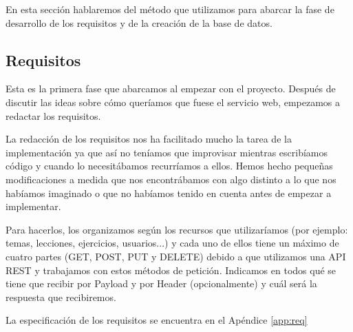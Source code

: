 En esta sección hablaremos del método que utilizamos para abarcar la fase de desarrollo de los requisitos y de la creación de la base de datos.

\subsection{Requisitos}
Esta es la primera fase que abarcamos al empezar con el proyecto. Después de discutir las ideas sobre cómo queríamos que fuese el servicio web, empezamos a redactar los requisitos.

La redacción de los requisitos nos ha facilitado mucho la tarea de la implementación ya que así no teníamos que improvisar mientras escribíamos código y cuando lo necesitábamos recurríamos a ellos.
Hemos hecho pequeñas modificaciones a medida que nos encontrábamos con algo distinto a lo que nos habíamos imaginado o que no habíamos tenido en cuenta antes de empezar a implementar.

Para hacerlos, los organizamos según los recursos que utilizaríamos (por ejemplo: temas, lecciones, ejercicios, usuarios...) y cada uno de ellos tiene un máximo de cuatro partes (GET, POST, PUT y DELETE) debido a que utilizamos una API REST y trabajamos con estos métodos de petición. Indicamos en todos qué se tiene que recibir por Payload y por Header (opcionalmente) y cuál será la respuesta que recibiremos.

La especificación de los requisitos se encuentra en el Apéndice \ref{app:req}


